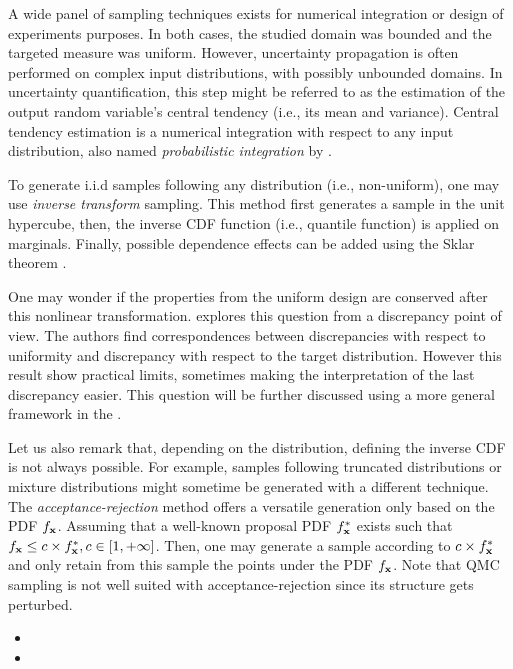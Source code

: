 A wide panel of sampling techniques exists for numerical integration or design of experiments purposes. 
In both cases, the studied domain was bounded and the targeted measure was uniform. 
However, uncertainty propagation is often performed on complex input distributions, with possibly unbounded domains. 
In uncertainty quantification, this step might be referred to as the estimation of the output random variable's central tendency (i.e., its mean and variance).
Central tendency estimation is a numerical integration with respect to any input distribution, also named \textit{probabilistic integration} by \citet{briol_oates_2019}.  

To generate i.i.d samples following any distribution (i.e., non-uniform), one may use \textit{inverse transform} sampling.
This method first generates a sample in the unit hypercube, then, the inverse CDF function (i.e., quantile function) is applied on marginals. 
Finally, possible dependence effects can be added using the Sklar theorem .

One may wonder if the properties from the uniform design are conserved after this nonlinear transformation. 
\citet{hickernell_2020} explores this question from a discrepancy point of view. 
The authors find correspondences between discrepancies with respect to uniformity and discrepancy with respect to the target distribution. 
However this result show practical limits, sometimes making the interpretation of the last discrepancy easier. 
This question will be further discussed using a more general framework in the .

Let us also remark that, depending on the distribution, defining the inverse CDF is not always possible.
For example, samples following truncated distributions or mixture distributions might sometime be generated with a different technique. 
The \textit{acceptance-rejection} method offers a versatile generation only based on the PDF $f_{{\bf x}}$.
Assuming that a well-known proposal PDF $f^*_{{\bf x}}$ exists such that $f_{{\bf x}} \leq c \times f^*_{{\bf x}}, c \in [1, +\infty]$. 
Then, one may generate a sample according to $c \times f^*_{{\bf x}}$ and only retain from this sample the points under the PDF $f_{{\bf x}}$.
Note that QMC sampling is not well suited with acceptance-rejection since its structure gets perturbed. 

\begin{itemize}
    \item {}
    \item {}
\end{itemize}

